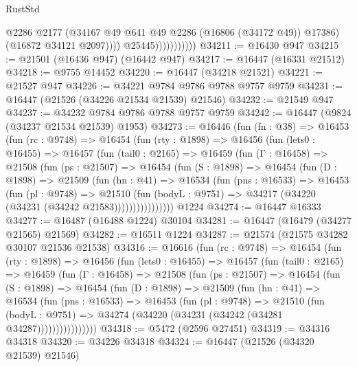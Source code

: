 \begin{lexlean}{RustStd}
\begin{coremodule}
                                @2286
                                @2177
                                (@34167 @49 @641 @49 @2286 (@16806 (@34172 @49)) @17386)
                                (@16872 @34121 @2097))))
                          @25445)))))))))))
@34211 := @16430 @947
@34215 := @21501 (@16436 @947) (@16442 @947)
@34217 := @16447 (@16331 @21512)
@34218 := @9755 @14452
@34220 := @16447 (@34218 @21521)
@34221 := @21527 @947
@34226 := @34221 @9784 @9786 @9788 @9757 @9759
@34231 := @16447 (@21526 (@34226 @21534 @21539) @21546)
@34232 := @21549 @947
@34237 := @34232 @9784 @9786 @9788 @9757 @9759
@34242 := @16447 (@9824 (@34237 @21534 @21539) @1953)
@34273 := @16446
    (fun (fn : @38) =>
    @16453
      (fun (rc : @9748) =>
      @16454
        (fun (rty : @1898) =>
        @16456
          (fun (lets0 : @16455) =>
          @16457
            (fun (tail0 : @2165) =>
            @16459
              (fun (Γ : @16458) =>
              @21508
                (fun (ps : @21507) =>
                @16454
                  (fun (S : @1898) =>
                  @16454
                    (fun (D : @1898) =>
                    @21509
                      (fun (hn : @41) =>
                      @16534
                        (fun (pns : @16533) =>
                        @16453
                          (fun (pl : @9748) =>
                          @21510
                            (fun (bodyL : @9751) =>
                            @34217 (@34220 (@34231 (@34242 @21583))))))))))))))))
    @1224
@34274 := @16447 @16333
@34277 := @16487 (@16488 @1224) @30104
@34281 := @16447 (@16479 (@34277 @21565) @21569)
@34282 := @16511 @1224
@34287 := @21574 (@21575 @34282 @30107 @21536 @21538)
@34316 := @16616
    (fun (rc : @9748) =>
    @16454
      (fun (rty : @1898) =>
      @16456
        (fun (lets0 : @16455) =>
        @16457
          (fun (tail0 : @2165) =>
          @16459
            (fun (Γ : @16458) =>
            @21508
              (fun (ps : @21507) =>
              @16454
                (fun (S : @1898) =>
                @16454
                  (fun (D : @1898) =>
                  @21509
                    (fun (hn : @41) =>
                    @16534
                      (fun (pns : @16533) =>
                      @16453
                        (fun (pl : @9748) =>
                        @21510
                          (fun (bodyL : @9751) =>
                          @34274 (@34220 (@34231 (@34242 (@34281 @34287))))))))))))))))
@34318 := @5472 (@2596 @27451)
@34319 := @34316 @34318
@34320 := @34226 @34318
@34324 := @16447 (@21526 (@34320 @21539) @21546)

\end{coremodule}
\end{lexlean}
